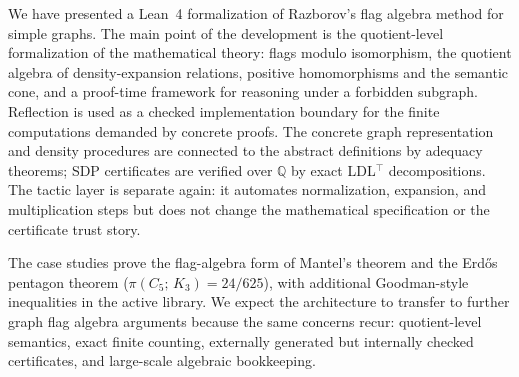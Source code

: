 \documentclass{article}
\newcommand{\tdensity}[2]{\pi(#1;\,#2)}
\begin{document}
We have presented a Lean~4 formalization of Razborov's flag algebra method for
simple graphs.  The main point of the development is the quotient-level
formalization of the mathematical theory: flags modulo isomorphism, the
quotient algebra of density-expansion relations, positive homomorphisms and the
semantic cone, and a proof-time framework for reasoning under a forbidden
subgraph.  Reflection is used as a checked implementation boundary for the
finite computations demanded by concrete proofs.  The concrete graph
representation and density procedures are connected to the abstract
definitions by adequacy theorems; SDP certificates are verified over
$\mathbb{Q}$ by exact LDL$^\top$ decompositions.  The tactic layer is separate
again: it automates normalization, expansion, and multiplication steps but does
not change the mathematical specification or the certificate trust story.

The case studies prove the flag-algebra form of Mantel's theorem and the
Erd\H{o}s pentagon theorem ($\tdensity{C_5}{K_3} = 24/625$), with additional
Goodman-style inequalities in the active library.  We expect the architecture
to transfer to further graph flag algebra arguments because the same concerns
recur: quotient-level semantics, exact finite counting, externally generated
but internally checked certificates, and large-scale algebraic bookkeeping.
\end{document}
